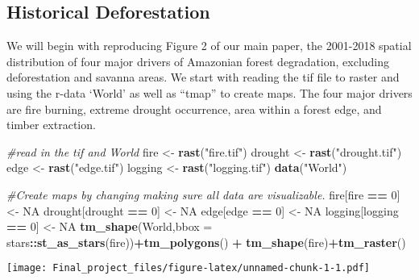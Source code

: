 \documentclass[
]{article}
\newenvironment{Shaded}{\begin{snugshade}}{\end{snugshade}}
\newcommand{\AttributeTok}[1]{\textcolor[rgb]{0.13,0.29,0.53}{#1}}
\newcommand{\CommentTok}[1]{\textcolor[rgb]{0.56,0.35,0.01}{\textit{#1}}}
\newcommand{\ConstantTok}[1]{\textcolor[rgb]{0.56,0.35,0.01}{#1}}
\newcommand{\DecValTok}[1]{\textcolor[rgb]{0.00,0.00,0.81}{#1}}
\newcommand{\FunctionTok}[1]{\textcolor[rgb]{0.13,0.29,0.53}{\textbf{#1}}}
\newcommand{\NormalTok}[1]{#1}
\newcommand{\OtherTok}[1]{\textcolor[rgb]{0.56,0.35,0.01}{#1}}
\newcommand{\SpecialCharTok}[1]{\textcolor[rgb]{0.81,0.36,0.00}{\textbf{#1}}}
\newcommand{\StringTok}[1]{\textcolor[rgb]{0.31,0.60,0.02}{#1}}
\begin{document}
\hypertarget{historical-deforestation}{%
\subsection{Historical Deforestation}\label{historical-deforestation}}

We will begin with reproducing Figure 2 of our main paper, the 2001-2018
spatial distribution of four major drivers of Amazonian forest
degradation, excluding deforestation and savanna areas. We start with
reading the tif file to raster and using the r-data `World' as well as
``tmap'' to create maps. The four major drivers are fire burning,
extreme drought occurrence, area within a forest edge, and timber
extraction.

\begin{Shaded}
\begin{Highlighting}[]
\CommentTok{\#read in the tif and World}
\NormalTok{fire }\OtherTok{\textless{}{-}} \FunctionTok{rast}\NormalTok{(}\StringTok{"fire.tif"}\NormalTok{)}
\NormalTok{drought }\OtherTok{\textless{}{-}} \FunctionTok{rast}\NormalTok{(}\StringTok{"drought.tif"}\NormalTok{)}
\NormalTok{edge }\OtherTok{\textless{}{-}} \FunctionTok{rast}\NormalTok{(}\StringTok{"edge.tif"}\NormalTok{)}
\NormalTok{logging }\OtherTok{\textless{}{-}} \FunctionTok{rast}\NormalTok{(}\StringTok{"logging.tif"}\NormalTok{)}
\FunctionTok{data}\NormalTok{(}\StringTok{"World"}\NormalTok{)}

\CommentTok{\#Create maps by changing making sure all data are visualizable. }
\NormalTok{fire[fire }\SpecialCharTok{==} \DecValTok{0}\NormalTok{] }\OtherTok{\textless{}{-}} \ConstantTok{NA}
\NormalTok{drought[drought }\SpecialCharTok{==} \DecValTok{0}\NormalTok{] }\OtherTok{\textless{}{-}} \ConstantTok{NA}
\NormalTok{edge[edge }\SpecialCharTok{==} \DecValTok{0}\NormalTok{] }\OtherTok{\textless{}{-}} \ConstantTok{NA}
\NormalTok{logging[logging }\SpecialCharTok{==} \DecValTok{0}\NormalTok{] }\OtherTok{\textless{}{-}} \ConstantTok{NA}
\FunctionTok{tm\_shape}\NormalTok{(World,}\AttributeTok{bbox =}\NormalTok{ stars}\SpecialCharTok{::}\FunctionTok{st\_as\_stars}\NormalTok{(fire))}\SpecialCharTok{+}\FunctionTok{tm\_polygons}\NormalTok{() }\SpecialCharTok{+}
  \FunctionTok{tm\_shape}\NormalTok{(fire)}\SpecialCharTok{+}\FunctionTok{tm\_raster}\NormalTok{()}
\end{Highlighting}
\end{Shaded}

\texttt{[image: Final\_project\_files/figure-latex/unnamed-chunk-1-1.pdf]}
\end{document}
